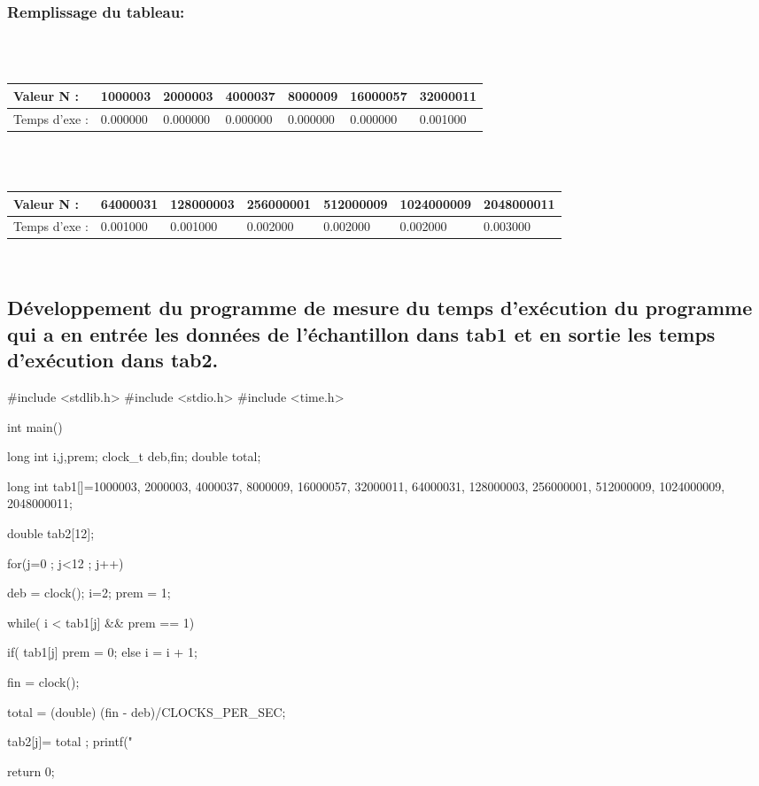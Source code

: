 \documentclass[12pt]{article}
\begin{document}
\subsubsection{Remplissage du tableau:}
\color{blue}
\textrm{  }
\\
\\
\begin{tabular}{|p{3cm}||p{1.8cm}|p{1.8cm}|p{1.8cm}|p{1.8cm}|p{1.8cm}|p{1.8cm}|}
\hline
Valeur N : & 1000003 & 2000003 & 4000037 & 8000009 & 16000057  & 32000011\\
\hline
Temps d'exe : & 0.000000 & 0.000000 & 0.000000 & 0.000000 & 0.000000 & 0.001000 \\
\hline
\end{tabular}
\\
\\
\begin{tabular}{|p{3cm}||p{1.8cm}|p{1.8cm}|p{1.8cm}|p{1.8cm}|p{1.8cm}|p{1.8cm}|}
\hline
Valeur N : & 64000031 & 128000003 & 256000001 & 512000009 &  1024000009 & 2048000011\\
\hline
Temps d'exe : &  0.001000 & 0.001000 & 0.002000 & 0.002000 & 0.002000 & 0.003000 \\
\hline
\end{tabular}


\textrm{  }
\\
\color{black}

\subsection{Développement du programme de mesure du temps d'exécution du programme qui a en entrée les données de l'échantillon dans tab1 et en sortie les temps d'exécution dans tab2. }
\begin{sql}
#include <stdlib.h>
#include <stdio.h>
#include <time.h>

int main()
{
	long int i,j,prem;
	clock_t deb,fin;
	double total;

	long int tab1[]={1000003, 2000003,	4000037,	8000009,	16000057,	32000011,	64000031,
	128000003,	256000001,	512000009,	1024000009,	2048000011};

	double tab2[12];

for(j=0 ; j<12 ; j++)
{
	deb = clock();
	i=2;
	prem = 1;

	while( i < tab1[j] && prem == 1){

		if( tab1[j]%
			prem = 0;
		else
			i = i + 1;
	}
	fin = clock();

	total = (double) (fin - deb)/CLOCKS_PER_SEC;
	
	tab2[j]= total ;
	printf("%
}
return 0;

}

\end{sql}
\end{document}
